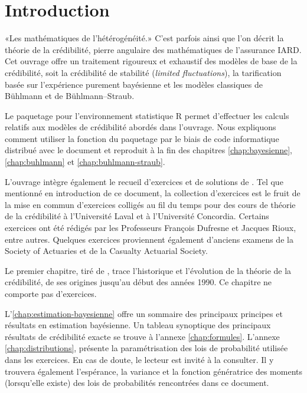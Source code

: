 
\chapter*{Introduction}

«Les mathématiques de l'hétérogénéité.» C'est parfois ainsi que l'on
décrit la théorie de la crédibilité, pierre angulaire des
mathématiques de l'assurance IARD. Cet ouvrage offre un traitement
rigoureux et exhaustif des modèles de base de la crédibilité, soit la
crédibilité de stabilité (\emph{limited fluctuations}), la
tarification basée sur l'expérience purement bayésienne et les modèles
classiques de Bühlmann et de Bühlmann--Straub.

Le paquetage  \citep{actuar} pour l'environnement
statistique R \citep{R} permet d'effectuer les calculs relatifs aux
modèles de crédibilité abordés dans l'ouvrage. Nous expliquons comment
utiliser la fonction  du paquetage par le biais de code
informatique distribué avec le document et reproduit à la fin des
chapitres \ref*{chap:bayesienne}, \ref*{chap:buhlmann} et
\ref*{chap:buhlmann-straub}.

L'ouvrage intègre également le recueil d'exercices et de solutions
de \citet{Cossette:credibilite:2008}. Tel que mentionné en
introduction de ce document, la collection d'exercices est le fruit de
la mise en commun d'exercices colligés au fil du temps pour des cours
de théorie de la crédibilité à l'Université Laval et à l'Université
Concordia. Certains exercices ont été rédigés par les Professeurs
François Dufresne et Jacques Rioux, entre autres. Quelques exercices
proviennent également d'anciens examens de la Society of Actuaries et
de la Casualty Actuarial Society.

Le premier chapitre, tiré de \cite{Goulet:masters}, trace l'historique et
l'évolution de la théorie de la crédibilité, de ses origines jusqu'au
début des années 1990. Ce chapitre ne comporte pas d'exercices.

L'\autoref{chap:estimation-bayesienne} offre un sommaire des
principaux principes et résultats en estimation bayésienne. Un tableau
synoptique des principaux résultats de crédibilité exacte se trouve à
l'annexe \ref{chap:formules}. L'annexe \ref{chap:distributions},
présente la paramétrisation des lois de probabilité utilisée dans les
exercices. En cas de doute, le lecteur est invité à la consulter. Il y
trouvera également l'espérance, la variance et la fonction génératrice
des moments (lorsqu'elle existe) des lois de probabilités rencontrées
dans ce document.

